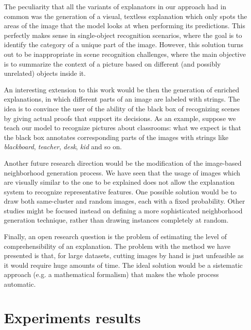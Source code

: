 \documentclass[12pt, twoside, a4paper]{report}
\newcommand{\whitepage}{\clearpage
						\thispagestyle{empty}
						\phantom{a}
						\vfill}
\begin{document}
The peculiarity that all the variants of explanators in our approach had in common was the generation of a visual, textless explanation which only spots the areas of the image that the model looks at when performing its predictions. This perfectly makes sense in single-object recognition scenarios, where the goal is to identify the category of a unique part of the image. However, this solution turns out to be inappropriate in scene recognition challenges, where the main objective is to summarize the context of a picture based on different (and possibly unrelated) objects inside it. 

An interesting extension to this work would be then the generation of enriched explanations, in which different parts of an image are labeled with strings. The idea is to convince the user of the ability of the black box of recognizing scenes by giving actual proofs that support its decisions. 
As an example, suppose we teach our model to recognize pictures about classrooms: what we expect is that the black box annotates corresponding parts of the images with strings like \textit{blackboard}, \textit{teacher}, \textit{desk}, \textit{kid} and so on.

Another future research direction would be the modification of the image-based neighborhood generation process. We have seen that the usage of images which are visually similar to the one to be explained does not allow the explanation system to recognize representative features. One possible solution would be to draw both same-cluster and random images, each with a fixed probability.
Other studies might be focused instead on defining a more sophisticated neighborhood generation technique, rather than drawing instances completely at random.

Finally, an open research question is the problem of estimating the level of comprehensibility of an explanation. The problem with the method we have presented is that, for large datasets, cutting images by hand is just unfeasible as it would require huge amounts of time. The ideal solution would be a sistematic approach (e.g. a mathematical formalism) that makes the whole process automatic.



 

\whitepage

\appendix

\chapter{Experiments results}
\end{document}
